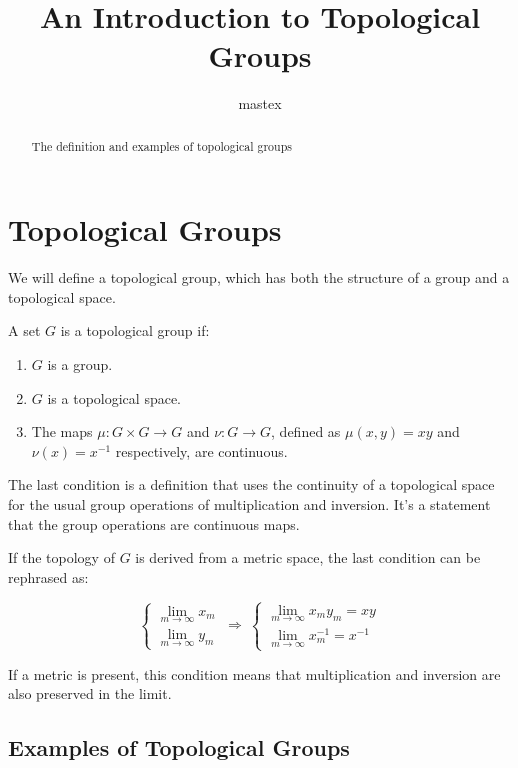 \documentclass[uplatex,a4j,12pt,dvipdfmx]{jsarticle}
\title{
An Introduction to Topological Groups
}
\author{
mastex
}
\begin{document}
\maketitle


\begin{abstract}
	The definition and examples of topological groups
\end{abstract}

\section{Topological Groups}

We will define a topological group, which has both the structure of a group and a topological space.

A set $G$ is a topological group if:

\begin{enumerate}
	\item $G$ is a group.
	\item $G$ is a topological space.
	\item The maps $\mu: G \times G \to G$ and $\nu: G \to G$, defined as $\mu(x,y)=xy$ and $\nu(x) = x^{-1}$ respectively, are continuous.
\end{enumerate}

The last condition is a definition that uses the continuity of a topological space for the usual group operations of multiplication and inversion.
It's a statement that the group operations are continuous maps.


If the topology of $G$ is derived from a metric space, the last condition can be rephrased as:

\[
	\left\{
	\begin{array}{r}
		\displaystyle \lim_{ m \to \infty } x_{m} \\
		\displaystyle \lim_{ m \to \infty } y_{m}
	\end{array}
	\right.
	\ \Rightarrow \
	\left\{
	\begin{array}{r}
		\displaystyle \lim_{m \to \infty } x_{m} y_{m} = xy \\
		\displaystyle \lim_{m \to \infty } x_{m}^{-1} = x^{-1}
	\end{array}
	\right.
\]

If a metric is present, this condition means that multiplication and inversion are also preserved in the limit.





\subsection{Examples of Topological Groups}
\end{document}
